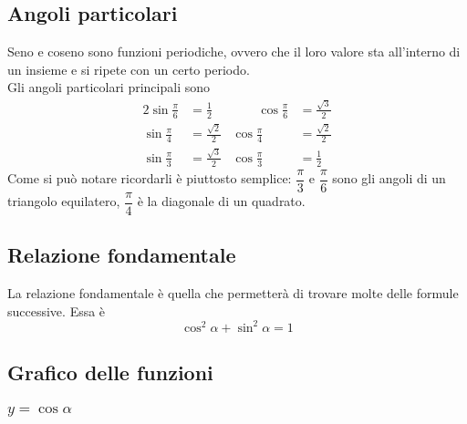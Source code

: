 \subsection{Angoli particolari}
Seno e coseno sono funzioni periodiche, ovvero che il loro valore sta all'interno di un insieme e si
ripete con un certo periodo.\\
Gli angoli particolari principali sono
\begin{alignat*}{2}
  \sin\frac{\pi}{6} &= \frac{1}{2} &\qquad \cos\frac{\pi}{6} &= \frac{\sqrt{3}}{2}\\
  \sin\frac{\pi}{4} &= \frac{\sqrt{2}}{2} & \cos\frac{\pi}{4} &= \frac{\sqrt{2}}{2}\\
  \sin\frac{\pi}{3} &= \frac{\sqrt{3}}{2} & \cos\frac{\pi}{3} &= \frac{1}{2}
\end{alignat*}
Come si può notare ricordarli è piuttosto semplice: $\dfrac{\pi}{3}$ e $\dfrac{\pi}{6}$ sono gli 
angoli di un triangolo equilatero, $\dfrac{\pi}{4}$ è la diagonale di un quadrato.

\subsection{Relazione fondamentale}
La relazione fondamentale è quella che permetterà di trovare molte delle formule successive. Essa è
\begin{equation*}
  \cos^2\alpha + \sin^2\alpha = 1
\end{equation*}

\subsection{Grafico delle funzioni}
\subsubsection{$y=\cos\alpha$}
\begin{center}
\end{center}
